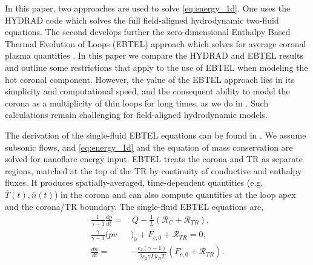 \documentclass[]{aastex}
\begin{document}
\par In this paper, two approaches are used to solve \autoref{eq:energy_1d}. One uses the HYDRAD code \citep{bradshaw_influence_2013} which solves the full field-aligned hydrodynamic two-fluid equations. The second develops further the zero-dimensional Enthalpy Based Thermal Evolution of Loops (EBTEL) approach which solves for average coronal plasma quantities \citep{klimchuk_highly_2008,cargill_enthalpy-based_2012,cargill_enthalpy-based_2012-1,cargill_modelling_2015}. In this paper we compare the HYDRAD and EBTEL results and outline some restrictions that apply to the use of EBTEL when modeling the hot coronal component. However, the value of the EBTEL approach lies in its simplicity and computational speed, and the consequent ability to model the corona as a multiplicity of thin loops for long times, as we do in . Such calculations remain challenging for field-aligned hydrodynamic models. 
	\par The derivation of the single-fluid EBTEL equations can be found in \citep{klimchuk_highly_2008,cargill_enthalpy-based_2012}. We assume subsonic flows, and \autoref{eq:energy_1d} and the equation of mass conservation are solved for nanoflare energy input. EBTEL treats the corona and TR as separate regions, matched at the top of the TR by continuity of conductive and enthalpy fluxes. It produces spatially-averaged, time-dependent quantities (e.g. $\bar{T}(t),\bar{n}(t)$) in the corona and can also compute quantities at the loop apex and the corona/TR boundary. The single-fluid EBTEL equations are,
	\begin{align}
		\frac{1}{\gamma - 1}\frac{d\bar{p}}{dt} =& \,\bar{Q} - \frac{1}{L}(\mathcal{R}_C + \mathcal{R}_{TR}), \label{eq:energy_0d} \\
		\frac{\gamma}{\gamma - 1}(pv&)_0 + F_{c,0} + \mathcal{R}_{TR} = 0, \label{eq:tr_energy_0d} \\
		\frac{d\bar{n}}{dt} =& -\frac{c_2(\gamma - 1)}{2c_3\gamma Lk_B\bar{T}}(F_{c,0} + \mathcal{R}_{TR}).\label{eq:mass_0d}
	\end{align}
\end{document}
